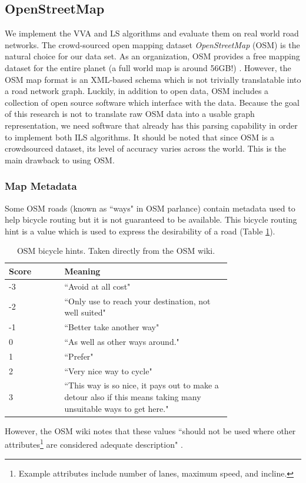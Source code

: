 \documentclass[11pt]{article}
\begin{document}
\subsection{OpenStreetMap}
We implement the VVA and LS algorithms and evaluate them on real world road networks. The crowd-sourced open mapping dataset \emph{OpenStreetMap} (OSM) is the natural choice for our data set. As an organization, OSM  provides a free mapping dataset for the entire planet (a full world map is around 56GB!) \cite{osm}. However, the OSM map format is an XML-based schema which is not trivially translatable into a road network graph. Luckily, in addition to open data, OSM includes a collection of open source software which interface with the data. Because the goal of this research is not to translate raw OSM data into a usable graph representation, we need software that already has this parsing capability in order to implement both ILS algorithms. It should be noted that since OSM is a crowdsourced dataset, its level of accuracy varies across the world. This is the main drawback to using OSM. 

\subsubsection{Map Metadata}
Some OSM roads (known as ``ways" in OSM parlance) contain metadata used to help bicycle routing but it is not guaranteed to be available. This bicycle routing hint is a value which is used to express the desirability of a road (Table \ref{tab:osm-hint}).  
\begin{table}[h]
\begin{center}
    \begin{tabular}{|l|p{0.75\linewidth}|}
        \hline
        \textbf{Score} & \textbf{Meaning} \\
        \hline
        -3 & ``Avoid at all cost" \\
        \hline
        -2 & ``Only use to reach your destination, not well suited" \\
        \hline
        -1 & ``Better take another way" \\
        \hline
        0 & ``As well as other ways around." \\
        \hline
        1 & ``Prefer" \\
        \hline
        2 & ``Very nice way to cycle" \\
        \hline
        3 & ``This way is so nice, it pays out to make a detour also if this means taking many unsuitable ways to get here." \\
        \hline
    \end{tabular}
\end{center}
\caption{OSM bicycle hints. Taken directly from the OSM wiki.}
\label{tab:osm-hint}
\end{table}
However, the OSM wiki notes that these values ``should not be used where other attributes\footnote{Example attributes include number of lanes, maximum speed, and incline.} are considered adequate description" \cite{osm}.
\end{document}
